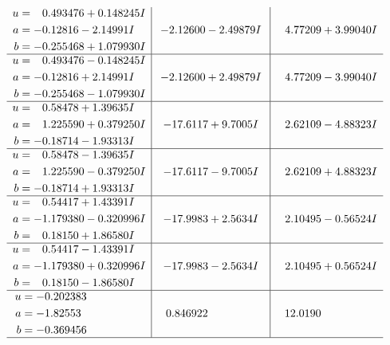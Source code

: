 \documentclass[1p]{elsarticle_modified}
\theoremstyle{definition}
\begin{document}
$$\begin{array}{c|c|c}
\begin{aligned}
u &= \phantom{-}0.493476 + 0.148245 I \\
a &= -0.12816 - 2.14991 I \\
b &= -0.255468 + 1.079930 I\end{aligned}
 & -2.12600 - 2.49879 I & \phantom{-}4.77209 + 3.99040 I \\ \hline\begin{aligned}
u &= \phantom{-}0.493476 - 0.148245 I \\
a &= -0.12816 + 2.14991 I \\
b &= -0.255468 - 1.079930 I\end{aligned}
 & -2.12600 + 2.49879 I & \phantom{-}4.77209 - 3.99040 I \\ \hline\begin{aligned}
u &= \phantom{-}0.58478 + 1.39635 I \\
a &= \phantom{-}1.225590 + 0.379250 I \\
b &= -0.18714 - 1.93313 I\end{aligned}
 & -17.6117 + 9.7005 I & \phantom{-}2.62109 - 4.88323 I \\ \hline\begin{aligned}
u &= \phantom{-}0.58478 - 1.39635 I \\
a &= \phantom{-}1.225590 - 0.379250 I \\
b &= -0.18714 + 1.93313 I\end{aligned}
 & -17.6117 - 9.7005 I & \phantom{-}2.62109 + 4.88323 I \\ \hline\begin{aligned}
u &= \phantom{-}0.54417 + 1.43391 I \\
a &= -1.179380 - 0.320996 I \\
b &= \phantom{-}0.18150 + 1.86580 I\end{aligned}
 & -17.9983 + 2.5634 I & \phantom{-}2.10495 - 0.56524 I \\ \hline\begin{aligned}
u &= \phantom{-}0.54417 - 1.43391 I \\
a &= -1.179380 + 0.320996 I \\
b &= \phantom{-}0.18150 - 1.86580 I\end{aligned}
 & -17.9983 - 2.5634 I & \phantom{-}2.10495 + 0.56524 I \\ \hline\begin{aligned}
u &= -0.202383\phantom{ +0.000000I} \\
a &= -1.82553\phantom{ +0.000000I} \\
b &= -0.369456\phantom{ +0.000000I}\end{aligned}
 & \phantom{-}0.846922\phantom{ +0.000000I} & \phantom{-}12.0190\phantom{ +0.000000I}\\
 \hline 
 \end{array}$$\newpage\newpage\renewcommand{\arraystretch}{1}
\end{document}
